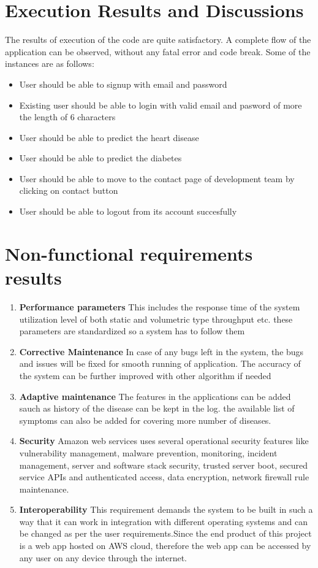\documentclass[oneside,12pt]{Classes/VTU}
\begin{document}
	\section{Execution Results and Discussions}
	The results of execution of the code are quite satisfactory. A complete flow of the application can be observed, without any fatal error and code break. Some of the
instances are as follows:
	\begin{itemize}
		\item User should be able to signup with email and password
		\item Existing user should be able to login with valid email and pasword of more the length of 6 characters
		\item User should be able to predict the heart disease 
		\item User should be able to predict the diabetes  
		\item User should be able to move to the contact page of development team by clicking on contact button 
		\item User should be able to logout from its account succesfully 
		
	\end{itemize}
	\section{Non-functional requirements results}
	\begin{enumerate}
		\item \textbf{Performance parameters} This includes the response time of the system utilization level of both static and volumetric type throughput etc. these parameters are standardized so a system has to follow them
		\item \textbf{Corrective Maintenance} In case of any bugs left in the system, the bugs and issues will be fixed for smooth running of application. The accuracy of the system can be further improved with other algorithm if needed
		\item \textbf{Adaptive maintenance} The features in the applications can be added sauch as history of the disease can be kept in the log. the available list of symptoms can also be added for covering more number of diseases.
		\item \textbf{Security} Amazon web services uses several operational security features like vulnerability management, malware prevention, monitoring, incident management, server and software stack security, trusted server boot, secured service APIs and authenticated access, data encryption, network firewall rule maintenance. 
		\item \textbf{Interoperability} This requirement demands the system to be built in such a way that it can work in integration with different operating systems and can be changed as per the user requirements.Since the end product of this project is a web app hosted on AWS cloud, therefore the web app can be accessed by any user on any device through the internet. 
	\end{enumerate}
	
\end{document}
